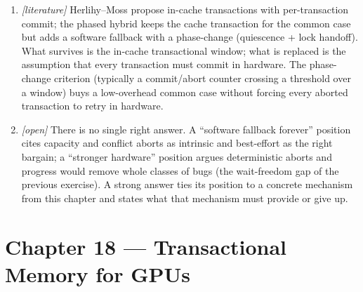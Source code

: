 \begin{enumerate}
          retry budget can promise progress --- wait-freedom needs a
          guarantee no best-effort mechanism gives.
    \item \emph{[literature]} Herlihy--Moss propose in-cache transactions
          with per-transaction commit; the phased hybrid keeps the cache
          transaction for the common case but adds a software fallback with
          a phase-change (quiescence + lock handoff).  What survives is the
          in-cache transactional window; what is replaced is the assumption
          that every transaction must commit in hardware.  The phase-change
          criterion (typically a commit/abort counter crossing a threshold
          over a window) buys a low-overhead common case without forcing
          every aborted transaction to retry in hardware.
    \item \emph{[open]} There is no single right answer.  A ``software
          fallback forever'' position cites capacity and conflict aborts as
          intrinsic and best-effort as the right bargain; a ``stronger
          hardware'' position argues deterministic aborts and progress would
          remove whole classes of bugs (the wait-freedom gap of the previous
          exercise).  A strong answer ties its position to a concrete
          mechanism from this chapter and states what that mechanism must
          provide or give up.
\end{enumerate}

\section*{Chapter 18 --- Transactional Memory for GPUs}


